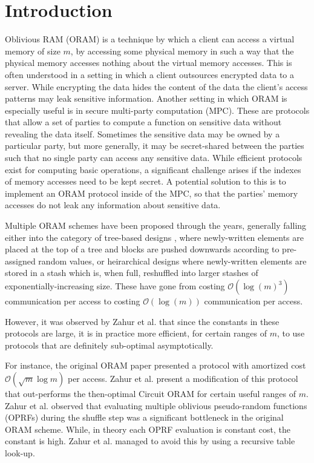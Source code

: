 \section{Introduction}

Oblivious RAM (ORAM) is a technique by which
a client can access a virtual memory of size $m$,
by accessing some physical memory 
in such a way that the physical memory accesses
nothing about the virtual memory accesses.
This is often understood in a setting in which a client
outsources encrypted data to a server.
While encrypting the data hides the content of the data
the client's access patterns may leak sensitive information.
Another setting in which ORAM is especially useful
is in secure multi-party computation (MPC).
These are protocols that allow a set of parties to compute
a function on sensitive data without revealing the data itself.
Sometimes the sensitive data may be owned by a particular
party, but more generally, it may be secret-shared between
the parties such that no single party can access any sensitive data.
While efficient protocols exist for computing basic operations,
a significant challenge arises if the indexes of memory accesses
need to be kept secret.
A potential solution to this is to implement an ORAM protocol
inside of the MPC, so that the parties' memory accesses
do not leak any information about sensitive data.

Multiple ORAM schemes have been proposed through the years,
generally falling either into the category of 
tree-based designs \cite{shi2011oblivious, stefanov2013path, wang2015circuit},
where newly-written elements are placed at the top of a tree
and blocks are pushed downwards according to pre-assigned random values,
or heirarchical designs \cite{ostrovsky1997private, asharov2018optorama}
where newly-written elements are stored in a stash
which is, when full, reshuffled into larger stashes
of exponentially-increasing size. 
These have gone from costing $\mathcal{O}(\log(m)^3)$ communication
per access to costing $\mathcal{O}(\log(m))$ 
communication per access.

However, it was observed by Zahur et al. \cite{zahur2016revisiting}
that since the constants in these protocols are large,
it is in practice more efficient, for certain ranges of $m$,
to use protocols that are definitely sub-optimal asymptotically.

For instance, the original ORAM paper \cite{ostrovsky1997private} 
presented a protocol with amortized cost $\mathcal{O}(\sqrt{m} \log{m})$
per access.
Zahur et al. present a modification of this protocol
that out-performs the then-optimal Circuit ORAM \cite{wang2015circuit}
for certain useful ranges of $m$.
Zahur et al. observed that evaluating multiple 
oblivious pseudo-random functions (OPRFs)
during the shuffle step was a significant bottleneck in the original ORAM scheme.
While, in theory each OPRF evaluation is constant cost, the constant is high.
Zahur et al. managed to avoid this by using a recursive table look-up.

